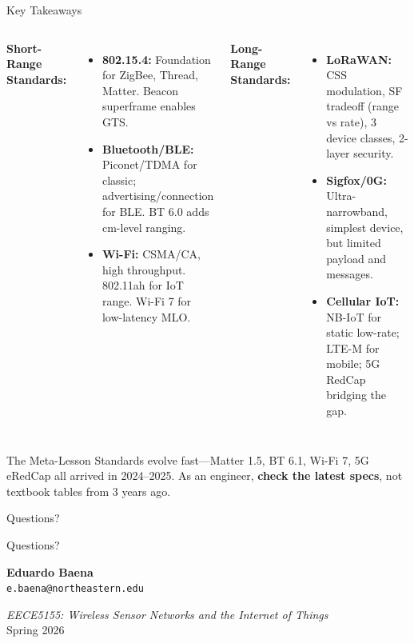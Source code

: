 \documentclass[aspectratio=169,11pt]{beamer}
\begin{document}
\begin{frame}{Key Takeaways}
    \begin{columns}
        \textbf{Short-Range Standards:}
        \begin{itemize}
            \item \textbf{802.15.4:} Foundation for ZigBee, Thread, Matter. Beacon superframe enables GTS.
            \item \textbf{Bluetooth/BLE:} Piconet/TDMA for classic; advertising/connection for BLE. BT 6.0 adds cm-level ranging.
            \item \textbf{Wi-Fi:} CSMA/CA, high throughput. 802.11ah for IoT range. Wi-Fi 7 for low-latency MLO.
        \end{itemize}
        
        \textbf{Long-Range Standards:}
        \begin{itemize}
            \item \textbf{LoRaWAN:} CSS modulation, SF tradeoff (range vs rate), 3 device classes, 2-layer security.
            \item \textbf{Sigfox/0G:} Ultra-narrowband, simplest device, but limited payload and messages.
            \item \textbf{Cellular IoT:} NB-IoT for static low-rate; LTE-M for mobile; 5G RedCap bridging the gap.
        \end{itemize}
    \end{columns}
    
    \vspace{0.3cm}
    \begin{alertblock}{The Meta-Lesson}
        Standards evolve fast---Matter 1.5, BT 6.1, Wi-Fi 7, 5G eRedCap all arrived in 2024--2025. As an engineer, \textbf{check the latest specs}, not textbook tables from 3 years ago.
    \end{alertblock}
\end{frame}

\begin{frame}{Questions?}
    \begin{center}
        \Huge Questions?
        
        \vspace{1cm}
        \normalsize
        \textbf{Eduardo Baena}\\
        \texttt{e.baena@northeastern.edu}
        
        \vspace{0.5cm}
        \textit{EECE5155: Wireless Sensor Networks and the Internet of Things}\\
        Spring 2026
    \end{center}
\end{frame}
\end{document}

